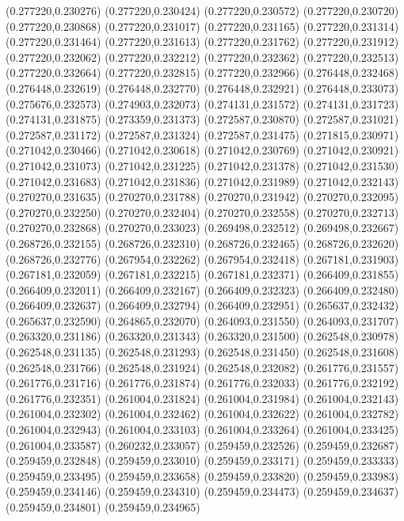 (0.277220,0.230276)
(0.277220,0.230424)
(0.277220,0.230572)
(0.277220,0.230720)
(0.277220,0.230868)
(0.277220,0.231017)
(0.277220,0.231165)
(0.277220,0.231314)
(0.277220,0.231464)
(0.277220,0.231613)
(0.277220,0.231762)
(0.277220,0.231912)
(0.277220,0.232062)
(0.277220,0.232212)
(0.277220,0.232362)
(0.277220,0.232513)
(0.277220,0.232664)
(0.277220,0.232815)
(0.277220,0.232966)
(0.276448,0.232468)
(0.276448,0.232619)
(0.276448,0.232770)
(0.276448,0.232921)
(0.276448,0.233073)
(0.275676,0.232573)
(0.274903,0.232073)
(0.274131,0.231572)
(0.274131,0.231723)
(0.274131,0.231875)
(0.273359,0.231373)
(0.272587,0.230870)
(0.272587,0.231021)
(0.272587,0.231172)
(0.272587,0.231324)
(0.272587,0.231475)
(0.271815,0.230971)
(0.271042,0.230466)
(0.271042,0.230618)
(0.271042,0.230769)
(0.271042,0.230921)
(0.271042,0.231073)
(0.271042,0.231225)
(0.271042,0.231378)
(0.271042,0.231530)
(0.271042,0.231683)
(0.271042,0.231836)
(0.271042,0.231989)
(0.271042,0.232143)
(0.270270,0.231635)
(0.270270,0.231788)
(0.270270,0.231942)
(0.270270,0.232095)
(0.270270,0.232250)
(0.270270,0.232404)
(0.270270,0.232558)
(0.270270,0.232713)
(0.270270,0.232868)
(0.270270,0.233023)
(0.269498,0.232512)
(0.269498,0.232667)
(0.268726,0.232155)
(0.268726,0.232310)
(0.268726,0.232465)
(0.268726,0.232620)
(0.268726,0.232776)
(0.267954,0.232262)
(0.267954,0.232418)
(0.267181,0.231903)
(0.267181,0.232059)
(0.267181,0.232215)
(0.267181,0.232371)
(0.266409,0.231855)
(0.266409,0.232011)
(0.266409,0.232167)
(0.266409,0.232323)
(0.266409,0.232480)
(0.266409,0.232637)
(0.266409,0.232794)
(0.266409,0.232951)
(0.265637,0.232432)
(0.265637,0.232590)
(0.264865,0.232070)
(0.264093,0.231550)
(0.264093,0.231707)
(0.263320,0.231186)
(0.263320,0.231343)
(0.263320,0.231500)
(0.262548,0.230978)
(0.262548,0.231135)
(0.262548,0.231293)
(0.262548,0.231450)
(0.262548,0.231608)
(0.262548,0.231766)
(0.262548,0.231924)
(0.262548,0.232082)
(0.261776,0.231557)
(0.261776,0.231716)
(0.261776,0.231874)
(0.261776,0.232033)
(0.261776,0.232192)
(0.261776,0.232351)
(0.261004,0.231824)
(0.261004,0.231984)
(0.261004,0.232143)
(0.261004,0.232302)
(0.261004,0.232462)
(0.261004,0.232622)
(0.261004,0.232782)
(0.261004,0.232943)
(0.261004,0.233103)
(0.261004,0.233264)
(0.261004,0.233425)
(0.261004,0.233587)
(0.260232,0.233057)
(0.259459,0.232526)
(0.259459,0.232687)
(0.259459,0.232848)
(0.259459,0.233010)
(0.259459,0.233171)
(0.259459,0.233333)
(0.259459,0.233495)
(0.259459,0.233658)
(0.259459,0.233820)
(0.259459,0.233983)
(0.259459,0.234146)
(0.259459,0.234310)
(0.259459,0.234473)
(0.259459,0.234637)
(0.259459,0.234801)
(0.259459,0.234965)
